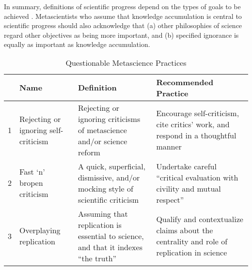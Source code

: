 \documentclass[authordate, meta, issue]{jote-new-article}
\begin{document}
In summary, definitions of scientific progress depend on the types of goals to be achieved \parencites[p. 236]{Haig2022}. Metascientists who assume that knowledge accumulation is central to scientific progress should also acknowledge that (a) other philosophies of science regard other objectives as being more important, and (b) specified ignorance is equally as important as knowledge accumulation.



\begin{table*}
  \begin{fullwidth}
    \caption{Questionable Metascience Practices}
    \label{tab:Table1}
    \begin{tabularx}{\linewidth}{@{} l >{\RaggedRight\arraybackslash}p{12em} >{\RaggedRight\arraybackslash}X >{\RaggedRight\arraybackslash}X@{}}
      \toprule
         & Name                                                                                                                                                                                                                                    & Definition                                                                                                                                                                                           & Recommended Practice \\

      \midrule
      1  & Rejecting or ignoring self-criticism                                                                                                                                                                                                    & Rejecting or ignoring criticisms of metascience and/or science reform
         & Encourage self-criticism, cite critics’ work, and respond in a thoughtful manner
      \\

      2  & Fast ‘n’ bropen criticism                                                                                                                                                                                                               & A quick, superficial, dismissive, and/or mocking style of scientific criticism
         & Undertake careful “critical evaluation with civility and mutual respect” \parencite{bib118}
      \\

      3  & Overplaying replication                                                                                                                                                                                                                 & Assuming that replication is essential to science, and that it indexes “the truth”
         & Qualify and contextualize claims about the centrality and role of replication in science
      \\


\end{tabularx}
\end{fullwidth}
\end{table*}
\end{document}
